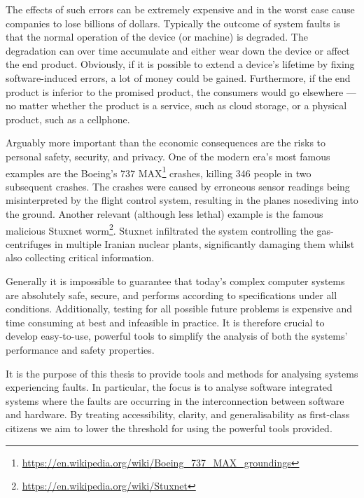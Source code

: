 The effects of such errors can be extremely expensive and in the worst case cause companies to lose billions of dollars.
Typically the outcome of system faults is that the normal operation of the device (or machine) is degraded.
The degradation can over time accumulate and either wear down the device or affect the end product.
Obviously, if it is possible to extend a device's lifetime by fixing software-induced errors, a lot of money could be gained. 
Furthermore, if the end product is inferior to the promised product, the consumers would go elsewhere --- no matter whether the product is a service, such as cloud storage, or a physical product, such as a cellphone.

Arguably more important than the economic consequences are the risks to personal safety, security, and privacy.
One of the modern era's most famous examples are the Boeing's 737 MAX\footnote{\url{https://en.wikipedia.org/wiki/Boeing_737_MAX_groundings}} crashes, killing 346 people in two subsequent crashes.
The crashes were caused by erroneous sensor readings being misinterpreted by the flight control system, resulting in the planes nosediving into the ground.
Another relevant (although less lethal) example is the famous malicious Stuxnet worm\footnote{\url{https://en.wikipedia.org/wiki/Stuxnet}}.
Stuxnet infiltrated the system controlling the gas-centrifuges in multiple Iranian nuclear plants, significantly damaging them whilst also collecting critical information. 

Generally it is impossible to guarantee that today's complex computer systems are absolutely safe, secure, and performs according to specifications under all conditions.
Additionally, testing for all possible future problems is expensive and time consuming at best and infeasible in practice.
It is therefore crucial to develop easy-to-use, powerful tools to simplify the analysis of both the systems' performance and safety properties.

It is the purpose of this thesis to provide tools and methods for analysing systems experiencing faults. 
In particular, the focus is to analyse software integrated systems where the faults are occurring in the interconnection between software and hardware.
By treating accessibility, clarity, and generalisability as first-class citizens we aim to lower the threshold for using the powerful tools provided.

